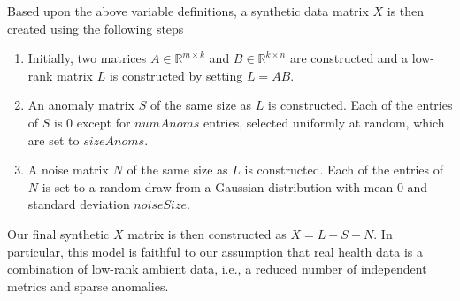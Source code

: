\documentclass[conference]{IEEEtran}
\begin{document}
Based upon the above variable definitions, a synthetic data matrix $X$ is then created using the following steps
\begin{enumerate}
\item Initially, two matrices $A \in \mathbb{R}^{m \times k}$ and $B \in \mathbb{R}^{k \times n}$ are constructed and a low-rank matrix $L$ is constructed by setting $L = AB$.
\item An anomaly matrix $S$ of the same size as $L$ is constructed.  Each of the entries of $S$ is $0$ except for $numAnoms$ entries, selected uniformly at random, which are set to $sizeAnoms$.
\item A noise matrix $N$ of the same size as $L$ is constructed. Each of the entries of $N$ is set to a random draw from a Gaussian distribution with mean $0$ and standard deviation $noiseSize$.
\end{enumerate}
\noindent Our final synthetic $X$ matrix is then constructed as $X=L+S+N$.  In particular, this model is faithful to  our assumption that real health data  is a combination of low-rank ambient data, i.e., a reduced number of independent metrics and sparse anomalies.
\end{document}
